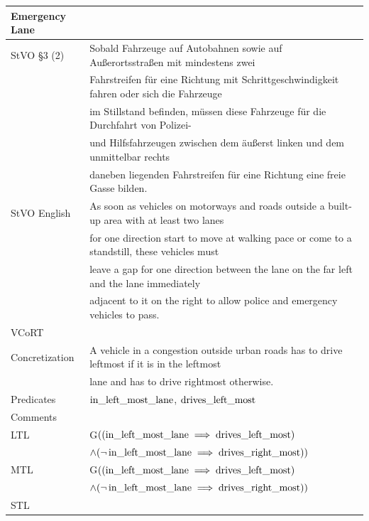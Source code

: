 \begin{table}[H]
	\centering
	\begin{tabular}[t]{ll}
		\toprule
		\textbf{Emergency Lane} &\\
		\midrule
		StVO \S 3 (2) & Sobald Fahrzeuge auf Autobahnen sowie auf Außerortsstraßen mit mindestens zwei \\
		& Fahrstreifen für eine Richtung mit Schrittgeschwindigkeit fahren oder sich die Fahrzeuge \\
		& im Stillstand befinden, müssen diese Fahrzeuge für die Durchfahrt von Polizei- \\
		& und Hilfsfahrzeugen zwischen dem äußerst linken und dem unmittelbar rechts \\
		& daneben liegenden Fahrstreifen für eine Richtung eine freie Gasse bilden.\\
		
		StVO English & As soon as vehicles on motorways and roads outside a built-up area with at least two lanes \\
		& for one direction start to move at walking pace or come to a standstill, these vehicles must \\
		& leave a gap for one direction between the lane on the far left and the lane immediately \\
		& adjacent to it on the right to allow police and emergency vehicles to pass.\\
		
		VCoRT  &  \\
		
		Concretization &  A vehicle in a congestion outside urban roads has to drive leftmost if it is in the leftmost \\
		& lane and has to drive rightmost otherwise. \\
		
		Predicates & $\operatorname*{in\_left\_most\_lane}$, $\operatorname*{drives\_left\_most}$\\
		
		Comments &  \\
		
		LTL & G$((\operatorname*{in\_left\_most\_lane} \implies \operatorname*{drives\_left\_most})$ \\
		& $\land (\neg \operatorname*{in\_left\_most\_lane} \implies \operatorname*{drives\_right\_most}))$\\
		MTL & G$((\operatorname*{in\_left\_most\_lane} \implies \operatorname*{drives\_left\_most})$ \\
		& $\land (\neg \operatorname*{in\_left\_most\_lane} \implies \operatorname*{drives\_right\_most}))$\\
		STL & \\
		\bottomrule
	\end{tabular}
\end{table}

